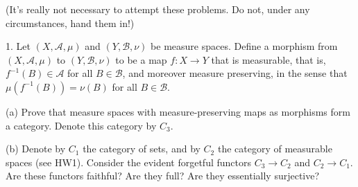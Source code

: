(It's really not necessary to attempt these problems. Do not, under any circumstances, hand them in!)

1. Let \((X,\mathcal{A},\mu)\) and \((Y,\mathcal{B},\nu)\) be measure spaces. Define a morphism from \((X,\mathcal{A},\mu)\) to \((Y,\mathcal{B},\nu)\) to be a map \(f:X\rightarrow Y\) that is measurable, that is, \(f^{- 1}(B) \in \mathcal{A}\) for all \(B \in \mathcal{B}\), and moreover measure preserving, in the sense that \(\mu(f^{- 1}(B)) = \nu(B)\) for all \(B \in \mathcal{B}\).

(a) Prove that measure spaces with measure-preserving maps as morphisms form a category. Denote this category by \(C_{3}\).

(b) Denote by \(C_{1}\) the category of sets, and by \(C_{2}\) the category of measurable spaces (see HW1). Consider the evident forgetful functors \(C_{3}\rightarrow C_{2}\) and \(C_{2}\rightarrow C_{1}\). Are these functors faithful? Are they full? Are they essentially surjective?
